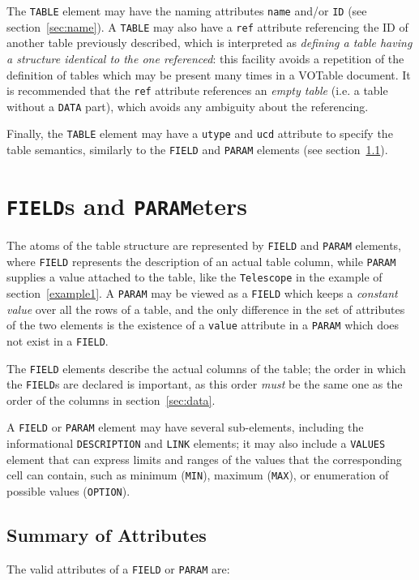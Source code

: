 \documentclass[11pt,a4paper]{ivoa}
\def\Aref#1{section~\ref{#1}}
\def\Arefs#1{section~\ref{#1}}
\let\fg=\color
\def\attr#1{{\tt{\fg{DarkRed}#1}}}
\def\elem#1{{\tt{\fg{DarkRed}#1}}}
\begin{document}
The \elem{TABLE} element may have the naming attributes \attr{name} and/or
\attr{ID} (see \Aref{sec:name}). A \elem{TABLE}
may also have a \attr{ref} attribute referencing the ID of another
table previously described, which is interpreted as
{\em defining a table having a structure identical to the one referenced}:
this facility avoids a repetition of the definition of tables which
may be present many times in a VOTable document.
It is recommended that the \attr{ref} attribute
references an {\em empty table} (i.e. a table without a
\elem{DATA} part), which avoids any ambiguity
about the referencing.

Finally, the \elem{TABLE} element may have a \attr{utype} and \attr{ucd}
attribute to specify the table semantics, similarly to  the \elem{FIELD} and
\elem{PARAM} elements (see \Aref{elem:FIELD}).

\section{\elem{FIELD}s and \elem{PARAM}eters}
\label{sec:field}

The atoms of the table structure are represented by \elem{FIELD} and
\elem{PARAM} elements, where \elem{FIELD} represents the description
of an actual table column, while \elem{PARAM} supplies a value
attached to the table, like the \attr{Telescope}
in the example of \Arefs{example1}. A \elem{PARAM} may be
viewed as a \elem{FIELD} which keeps a {\em constant value} over all
the rows of a table, and the only difference in the set of attributes
of the two elements
is the existence of a \attr{value} attribute in a \elem{PARAM}
which does not exist in a \elem{FIELD}.

The  \elem{FIELD} elements describe the actual columns of the table;
the order in which the \elem{FIELD}s are declared is important,
as this order {\em must} be the same one as the order of the
columns in \Aref{sec:data}.

A {\elem{FIELD}} or \elem{PARAM} element may have several sub-elements,
including the informational {\elem{DESCRIPTION}}
and {\elem{LINK}} elements;
it may also include a {\elem{VALUES}} element
that can express limits and ranges of the values that the
corresponding cell can contain, such as minimum (\elem{MIN}),
maximum (\elem{MAX}), or
enumeration of possible values (\elem{OPTION}).

\subsection{Summary of Attributes}
\label{elem:FIELD}
\label{elem:PARAM}
The valid attributes of a \elem{FIELD} or \elem{PARAM} are:
\end{document}
